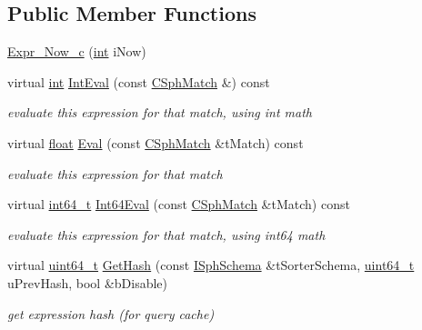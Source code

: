 \subsection*{Public Member Functions}
\begin{DoxyCompactItemize}
\item 
\hyperlink{structExpr__Now__c_adcfd295ab70fc622933cce9cb6da8aa3}{Expr\-\_\-\-Now\-\_\-c} (\hyperlink{sphinxexpr_8cpp_a4a26e8f9cb8b736e0c4cbf4d16de985e}{int} i\-Now)
\item 
virtual \hyperlink{sphinxexpr_8cpp_a4a26e8f9cb8b736e0c4cbf4d16de985e}{int} \hyperlink{structExpr__Now__c_a230256515bd9ddb4682ac18279908fde}{Int\-Eval} (const \hyperlink{classCSphMatch}{C\-Sph\-Match} \&) const 
\begin{DoxyCompactList}\small\item\em evaluate this expression for that match, using int math \end{DoxyCompactList}\item 
virtual \hyperlink{sphinxexpr_8cpp_a0e0d0739f7035f18f949c2db2c6759ec}{float} \hyperlink{structExpr__Now__c_a402563db028f5419f7476a7fd6ecaa5b}{Eval} (const \hyperlink{classCSphMatch}{C\-Sph\-Match} \&t\-Match) const 
\begin{DoxyCompactList}\small\item\em evaluate this expression for that match \end{DoxyCompactList}\item 
virtual \hyperlink{sphinxstd_8h_a996e72f71b11a5bb8b3b7b6936b1516d}{int64\-\_\-t} \hyperlink{structExpr__Now__c_af827c7ba1dcc09756e213a9bd457c929}{Int64\-Eval} (const \hyperlink{classCSphMatch}{C\-Sph\-Match} \&t\-Match) const 
\begin{DoxyCompactList}\small\item\em evaluate this expression for that match, using int64 math \end{DoxyCompactList}\item 
virtual \hyperlink{sphinxstd_8h_aaa5d1cd013383c889537491c3cfd9aad}{uint64\-\_\-t} \hyperlink{structExpr__Now__c_af662509588b9374b660d6b4dd0421ebf}{Get\-Hash} (const \hyperlink{classISphSchema}{I\-Sph\-Schema} \&t\-Sorter\-Schema, \hyperlink{sphinxstd_8h_aaa5d1cd013383c889537491c3cfd9aad}{uint64\-\_\-t} u\-Prev\-Hash, bool \&b\-Disable)
\begin{DoxyCompactList}\small\item\em get expression hash (for query cache) \end{DoxyCompactList}\end{DoxyCompactItemize}
